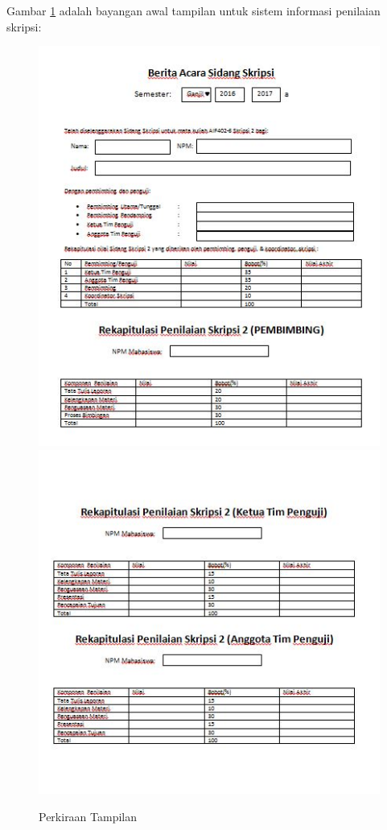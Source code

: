 	Gambar \ref{fig:tampilan} adalah bayangan awal tampilan untuk sistem informasi penilaian skripsi:
	\begin{figure}[H]
		\centering
		\includegraphics[scale=0.75]{Gambar/tampilan1}
		\includegraphics[scale=0.75]{Gambar/tampilan2}
		\caption{Perkiraan Tampilan}
		\label{fig:tampilan}
	\end{figure}